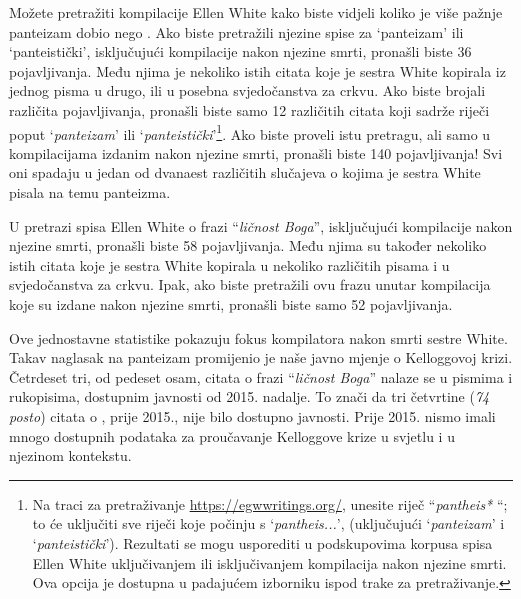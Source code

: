 Možete pretražiti kompilacije Ellen White kako biste vidjeli koliko je više pažnje panteizam dobio nego . Ako biste pretražili njezine spise za ‘panteizam’ ili ‘panteistički’, isključujući kompilacije nakon njezine smrti, pronašli biste 36 pojavljivanja. Među njima je nekoliko istih citata koje je sestra White kopirala iz jednog pisma u drugo, ili u posebna svjedočanstva za crkvu. Ako biste brojali različita pojavljivanja, pronašli biste samo 12 različitih citata koji sadrže riječi poput ‘\textit{panteizam}’ ili ‘\textit{panteistički}’\footnote{Na traci za pretraživanje \href{https://egwwritings.org/}{https://egwwritings.org/}, unesite riječ “\textit{pantheis*} “; to će uključiti sve riječi koje počinju s ‘\textit{pantheis...}’, (uključujući ‘\textit{panteizam}’ i ‘\textit{panteistički}’). Rezultati se mogu usporediti u podskupovima korpusa spisa Ellen White uključivanjem ili isključivanjem kompilacija nakon njezine smrti. Ova opcija je dostupna u padajućem izborniku ispod trake za pretraživanje.}. Ako biste proveli istu pretragu, ali samo u kompilacijama izdanim nakon njezine smrti, pronašli biste 140 pojavljivanja! Svi oni spadaju u jedan od dvanaest različitih slučajeva o kojima je sestra White pisala na temu panteizma.

U pretrazi spisa Ellen White o frazi “\textit{ličnost Boga}”, isključujući kompilacije nakon njezine smrti, pronašli biste 58 pojavljivanja. Među njima su također nekoliko istih citata koje je sestra White kopirala u nekoliko različitih pisama i u svjedočanstva za crkvu. Ipak, ako biste pretražili ovu frazu unutar kompilacija koje su izdane nakon njezine smrti, pronašli biste samo 52 pojavljivanja.

Ove jednostavne statistike pokazuju fokus kompilatora nakon smrti sestre White. Takav naglasak na panteizam promijenio je naše javno mjenje o Kelloggovoj krizi. Četrdeset tri, od pedeset osam, citata o frazi “\textit{ličnost Boga}” nalaze se u pismima i rukopisima, dostupnim javnosti od 2015. nadalje. To znači da tri četvrtine (\textit{74 posto}) citata o , prije 2015., nije bilo dostupno javnosti. Prije 2015. nismo imali mnogo dostupnih podataka za proučavanje Kelloggove krize u svjetlu  i u njezinom kontekstu.
